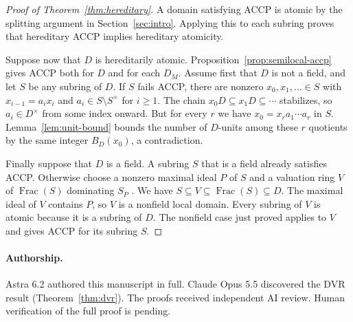 \documentclass[11pt, letterpaper]{article}
\theoremstyle{definition}
\theoremstyle{remark}
\DeclareMathOperator{\Frac}{Frac}
\begin{document}
\begin{proof}[Proof of Theorem~\ref{thm:hereditary}]
    A domain satisfying ACCP is atomic by the splitting argument in Section~\ref{sec:intro}.
    Applying this to each subring proves that hereditary ACCP implies hereditary atomicity.

    Suppose now that $D$ is hereditarily atomic.
    Proposition~\ref{prop:semilocal-accp} gives ACCP both for $D$ and for each $D_M$.
    Assume first that $D$ is not a field, and let $S$ be any subring of $D$.
    If $S$ fails ACCP, there are nonzero $x_0, x_1, \ldots \in S$ with $x_{i - 1} = a_i x_i$ and $a_i \in S \setminus S^{\times}$ for $i \ge 1$.
    The chain $x_0D \subseteq x_1D \subseteq \cdots$ stabilizes, so $a_i \in D^{\times}$ from some index onward.
    But for every $r$ we have $x_0 = x_r a_1 \cdots a_r$ in $S$.
    Lemma~\ref{lem:unit-bound} bounds the number of $D$-units among these $r$ quotients by the same integer $B_D(x_0)$, a contradiction.

    Finally suppose that $D$ is a field.
    A subring $S$ that is a field already satisfies ACCP.
    Otherwise choose a nonzero maximal ideal $P$ of $S$ and a valuation ring $V$ of $\Frac(S)$ dominating $S_P$ \cite{Stacks}.
    We have $S \subseteq V \subseteq \Frac(S) \subseteq D$.
    The maximal ideal of $V$ contains $P$, so $V$ is a nonfield local domain.
    Every subring of $V$ is atomic because it is a subring of $D$.
    The nonfield case just proved applies to $V$ and gives ACCP for its subring $S$.
\end{proof}

\begin{samepage}
    \paragraph{Authorship.}
    Astra 6.2 authored this manuscript in full.
    Claude Opus 5.5 discovered the DVR result (Theorem~\ref{thm:dvr}).
    The proofs received independent AI review.
    Human verification of the full proof is pending.
    \par
\end{samepage}
\end{document}
